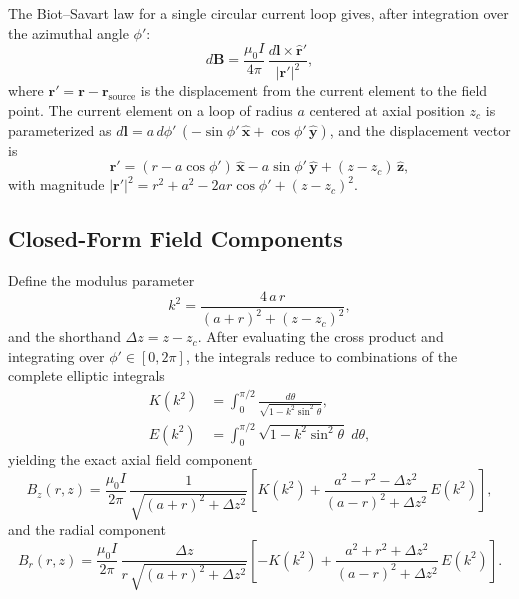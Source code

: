 \documentclass[11pt,a4paper]{report}
\begin{document}
The Biot--Savart law for a single circular current loop gives, after integration over the azimuthal angle $\phi'$:
\begin{equation}
  d\mathbf{B} = \frac{\mu_0 I}{4\pi} \,
  \frac{d\mathbf{l} \times \hat{\mathbf{r}}'}{|\mathbf{r}'|^2},
  \label{eq:m04-biot-savart}
\end{equation}
where $\mathbf{r}' = \mathbf{r} - \mathbf{r}_\mathrm{source}$ is the displacement from the current element to the field point.  The current element on a loop of radius $a$ centered at axial position $z_c$ is parameterized as $d\mathbf{l} = a\,d\phi'\,(-\sin\phi'\,\hat{\mathbf{x}} + \cos\phi'\,\hat{\mathbf{y}})$, and the displacement vector is
\begin{equation}
  \mathbf{r}' = (r - a\cos\phi')\,\hat{\mathbf{x}} - a\sin\phi'\,\hat{\mathbf{y}} + (z - z_c)\,\hat{\mathbf{z}},
\end{equation}
with magnitude $|\mathbf{r}'|^2 = r^2 + a^2 - 2ar\cos\phi' + (z-z_c)^2$.

\subsection{Closed-Form Field Components}

Define the modulus parameter
\begin{equation}
  k^2 = \frac{4\,a\,r}{(a + r)^2 + (z - z_c)^2},
  \label{eq:m04-ksq}
\end{equation}
and the shorthand $\Delta z = z - z_c$.  After evaluating the cross product and integrating over $\phi' \in [0, 2\pi]$, the integrals reduce to combinations of the complete elliptic integrals
\begin{align}
  K(k^2) &= \int_0^{\pi/2} \frac{d\theta}{\sqrt{1 - k^2 \sin^2\theta}},
  \label{eq:m04-ellipk} \\
  E(k^2) &= \int_0^{\pi/2} \sqrt{1 - k^2 \sin^2\theta}\;d\theta,
  \label{eq:m04-ellipe}
\end{align}
yielding the exact axial field component
\begin{equation}
  \boxed{
  B_z(r,z) = \frac{\mu_0 I}{2\pi} \,
  \frac{1}{\sqrt{(a+r)^2 + \Delta z^2}} \left[
    K(k^2) + \frac{a^2 - r^2 - \Delta z^2}{(a-r)^2 + \Delta z^2}\,E(k^2)
  \right],}
  \label{eq:m04-bz}
\end{equation}
and the radial component
\begin{equation}
  \boxed{
  B_r(r,z) = \frac{\mu_0 I}{2\pi} \,
  \frac{\Delta z}{r\,\sqrt{(a+r)^2 + \Delta z^2}} \left[
    -K(k^2) + \frac{a^2 + r^2 + \Delta z^2}{(a-r)^2 + \Delta z^2}\,E(k^2)
  \right].}
  \label{eq:m04-br}
\end{equation}
\end{document}

